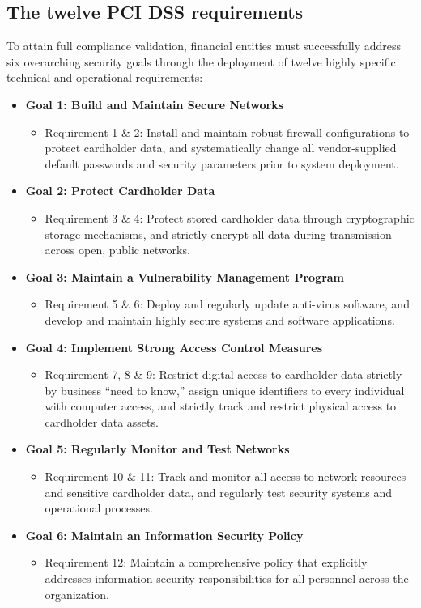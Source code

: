 \documentclass[12pt,a4paper,oneside]{report}
\begin{document}
	\subsection{The twelve PCI DSS requirements}
	To attain full compliance validation, financial entities must successfully address six overarching security goals through the deployment of twelve highly specific technical and operational requirements:
	\begin{itemize}
		\item \textbf{Goal 1: Build and Maintain Secure Networks}
		\begin{itemize}
			\item Requirement 1 \& 2: Install and maintain robust firewall configurations to protect cardholder data, and systematically change all vendor-supplied default passwords and security parameters prior to system deployment.
		\end{itemize}
		\item \textbf{Goal 2: Protect Cardholder Data}
		\begin{itemize}
			\item Requirement 3 \& 4: Protect stored cardholder data through cryptographic storage mechanisms, and strictly encrypt all data during transmission across open, public networks.
		\end{itemize}
		\item \textbf{Goal 3: Maintain a Vulnerability Management Program}
		\begin{itemize}
			\item Requirement 5 \& 6: Deploy and regularly update anti-virus software, and develop and maintain highly secure systems and software applications.
		\end{itemize}
		\item \textbf{Goal 4: Implement Strong Access Control Measures}
		\begin{itemize}
			\item Requirement 7, 8 \& 9: Restrict digital access to cardholder data strictly by business ``need to know,'' assign unique identifiers to every individual with computer access, and strictly track and restrict physical access to cardholder data assets.
		\end{itemize}
		\item \textbf{Goal 5: Regularly Monitor and Test Networks}
		\begin{itemize}
			\item Requirement 10 \& 11: Track and monitor all access to network resources and sensitive cardholder data, and regularly test security systems and operational processes.
		\end{itemize}
		\item \textbf{Goal 6: Maintain an Information Security Policy}
		\begin{itemize}
			\item Requirement 12: Maintain a comprehensive policy that explicitly addresses information security responsibilities for all personnel across the organization.
		\end{itemize}
	\end{itemize}
	
\end{document}
